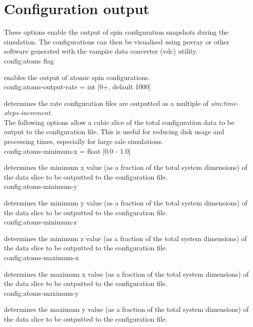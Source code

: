 \section*{Configuration output}
These options enable the output of spin configuration snapshots during the
simulation. The configurations can then be visualised using povray or other
software generated with the vampire data converter (vdc) utility.\\

{\zicf config:atoms flag} enables
the output of atomic spin configurations.\\

{\zicf config:atoms-output-rate = int [0+, default 1000]}
determines the rate configuration files are outputted as a multiple of \textit{sim:time-steps-increment}.\\

The following options allow a cubic slice of the total configuration data to
be output to the configuration file. This is useful for reducing disk usage and
processing times, especially for large sale simulations.\\

{\zicf config:atoms-minimum-x = float [0.0 - 1.0]}
determines the minimum x value (as a fraction of the total system dimensions)
of the data slice to be outputted to the configuration file.\\

{\zicf config:atoms-minimum-y}
determines the minimum y value (as a fraction of the total system dimensions)
of the data slice to be outputted to the configuration file.\\

{\zicf config:atoms-minimum-z}
determines the minimum z value (as a fraction of the total system dimensions)
of the data slice to be outputted to the configuration file.\\

{\zicf config:atoms-maximum-x}
determines the maximum x value (as a fraction of the total system dimensions)
of the data slice to be outputted to the configuration file.\\

{\zicf config:atoms-maximum-y}
determines the maximum y value (as a fraction of the total system dimensions)
of the data slice to be outputted to the configuration file.\\

